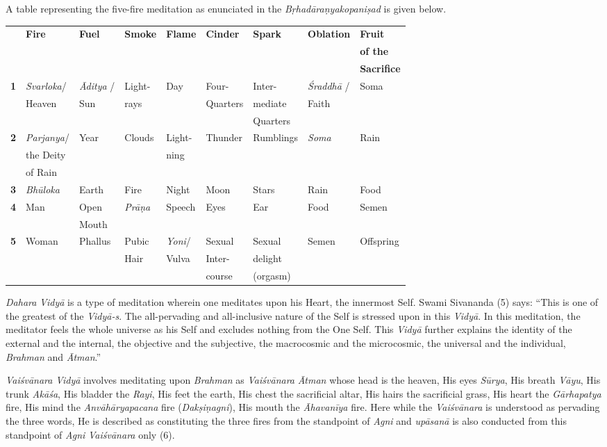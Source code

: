 A table representing the five-fire meditation as enunciated in the \emph{Bṛhadāraṇyakopaniṣad} is given below.

\small\addtolength{\tabcolsep}{-5pt}
\begin{longtable}{|l|l|l|l|l|l|l|l|l|}
\hline
 & \textbf{Fire} & \textbf{Fuel} & \textbf{Smoke} & \textbf{Flame} & \textbf{Cinder} & \textbf{Spark} & \textbf{Oblation} & \textbf{Fruit}\tabularnewline
 & & & & & & & &\textbf{of the}\tabularnewline
 & & & & & & & &\textbf{Sacrifice}\tabularnewline
\hline
\textbf{1} & \emph{Svarloka}/ & \emph{Āditya} / & Light- & Day & Four- & Inter- & \emph{Śraddhā} /  & Soma\tabularnewline
& Heaven & Sun & rays & & Quarters & mediate & Faith &\tabularnewline
&  &  &  & &  & Quarters &  &\tabularnewline
\hline
\textbf{2} & \emph{Parjanya}/ & Year & Clouds & Light- & Thunder & Rumblings & \emph{Soma} & Rain\tabularnewline
& the Deity &  &  & ning &  &  &  &\tabularnewline
& of Rain &  &  &  &  &  &  & \tabularnewline
\hline
\textbf{3} & \emph{Bhūloka} & Earth & Fire & Night & Moon & Stars & Rain & Food\tabularnewline
\hline
\textbf{4} & Man & Open & \emph{Prāṇa} & Speech & Eyes & Ear & Food & Semen\tabularnewline
& & Mouth &  &  &  &  &  &\tabularnewline
\hline
\textbf{5} & Woman & Phallus & Pubic & \emph{Yoni}/ & Sexual & Sexual  & Semen & Offspring\tabularnewline
&  &  & Hair & Vulva & Inter- & delight &  &\tabularnewline
& &  &  &  & course & (orgasm) &  &\tabularnewline
\hline
\end{longtable}

\emph{Dahara} \emph{Vidyā} is a type of meditation wherein one meditates upon his Heart, the innermost Self. Swami Sivananda (5) says: ``This is one of the greatest of the \emph{Vidyā-s}. The all-pervading and all-inclusive nature of the Self is stressed upon in this \emph{Vidyā}. In this meditation, the meditator feels the whole universe as his Self and excludes nothing from the One Self. This \emph{Vidyā} further explains the identity of the external and the internal, the objective and the subjective, the macrocosmic and the microcosmic, the universal and the individual, \emph{Brahman} and \emph{Ātman}.''

\emph{Vaiśvānara} \emph{Vidyā} involves meditating upon \emph{Brahman} as \emph{Vaiśvānara} \emph{Ātman} whose head is the heaven, His eyes \emph{Sūrya}, His breath \emph{Vāyu}, His trunk \emph{Akāśa}, His bladder the \emph{Rayi}, His feet the earth, His chest the sacrificial altar, His hairs the sacrificial grass, His heart the \emph{Gārhapatya} fire, His mind the \emph{Anvāhāryapacana} fire (\emph{Dakṣiṇagni}), His mouth the \emph{Āhavanīya} fire. Here while the \emph{Vaiśvānara} is understood as pervading the three words, He is described as constituting the three fires from the standpoint of \emph{Agni} and \emph{upāsanā} is also conducted from this standpoint of \emph{Agni} \emph{Vaiśvānara} only (6).

